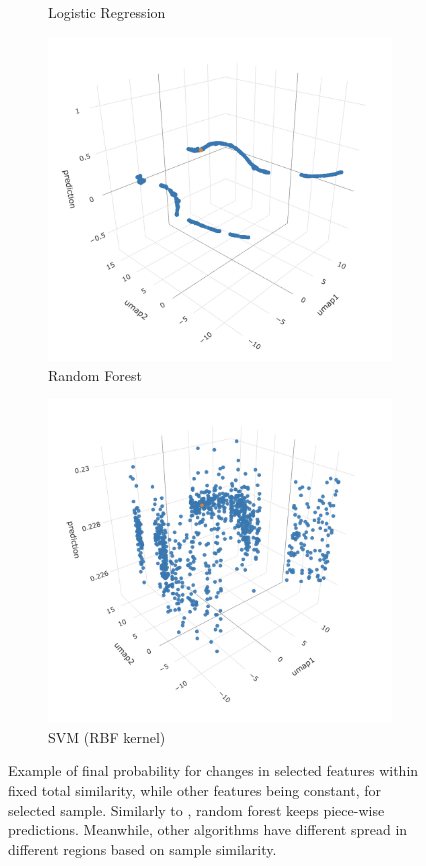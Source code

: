 \documentclass{article}
\begin{document}
\begin{samepage}
\begin{figure}
\begin{subfigure}{.32\textwidth}
        \caption{Logistic Regression}
        \label{fig:posthoc-embedding-lin}
    \end{subfigure}
    \begin{subfigure}{.32\textwidth}
        \centering
        \includegraphics[width=.8\linewidth]{img/posthoc-embedding-xgboost.png}
        \caption{Random Forest}
        \label{fig:posthoc-embedding-xgboost}
    \end{subfigure}
    \begin{subfigure}{.32\textwidth}
        \centering
        \includegraphics[width=.8\linewidth]{img/posthoc-embedding-svm.png}
        \caption{SVM (RBF kernel)}
        \label{fig:posthoc-embedding-svm}
    \end{subfigure}
    \caption{Example of final probability for changes in selected features within fixed total similarity, while other features being constant, for selected sample. Similarly to , random forest keeps piece-wise predictions. Meanwhile, other algorithms have different spread in different regions based on sample similarity.}
    \label{fig:posthoc-embedding}
\end{figure}
\end{samepage}
\end{document}
